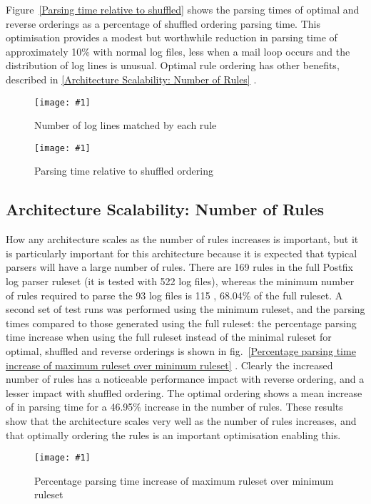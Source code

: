 \documentclass{svmult}
\newcommand{\showgraph}[3]{%
    \begin{figure}[btp]%
        \texttt{[image: \#1]}%
        \caption{#2}\label{#3}%
    \end{figure}%
}
\newcommand{\sectionref}[1]{%
    \textsection{}\vref*{#1}%
}
\newcommand{\refwithlabel}[2]{%
    #1~\vref{#2}%
}
\newcommand{\graphref}[1]{%
    \refwithlabel{fig.}{#1}%
}
\newcommand{\Graphref}[1]{%
    \refwithlabel{Figure}{#1}%
}
\newcommand{\numberOFlogFILES}[0]{%
    93%
}
\newcommand{\numberOFrules}[0]{%
    169%
}
\newcommand{\numberOFrulesMINIMUM}[0]{%
    115%
}
\newcommand{\numberOFlogFILESall}[0]{%
    522%
}
\newcommand{\numberOFrulesMINIMUMpercentage}[0]{%
    68.04\%%
}
\newcommand{\numberOFrulesMAXIMUMpercentage}[0]{%
    46.95\%%
}
\begin{document}
\Graphref{Parsing time relative to shuffled} shows the parsing times of
optimal and reverse orderings as a percentage of shuffled ordering parsing
time.  This optimisation provides a modest but worthwhile reduction in
parsing time of approximately 10\% with normal log files, less when a mail
loop occurs and the distribution of log lines is unusual.  Optimal rule
ordering has other benefits, described in \sectionref{Architecture
Scalability: Number of Rules}.  \showgraph{build/graph-hits}{Number of log
lines matched by each rule}{rule hits graph}
\showgraph{build/graph-optimal-and-reverse-vs-shuffle}{Parsing time
relative to shuffled ordering}{Parsing time relative to shuffled}

\subsection{Architecture Scalability: Number of Rules}

\label{Architecture Scalability: Number of Rules}

How any architecture scales as the number of rules increases is important,
but it is particularly important for this architecture because it is
expected that typical parsers will have a large number of rules.  There are
\numberOFrules{} rules in the full Postfix log parser ruleset (it is tested
with \numberOFlogFILESall{} log files), whereas the
minimum number of rules required to parse the \numberOFlogFILES{} log files
is \numberOFrulesMINIMUM{}, \numberOFrulesMINIMUMpercentage{} of the full
ruleset.  A second set of test runs was performed using the minimum
ruleset, and the parsing times compared to those generated using the full
ruleset: the percentage parsing time increase when using the full ruleset
instead of the minimal ruleset for optimal, shuffled and reverse orderings
is shown in \graphref{Percentage parsing time increase of maximum ruleset
over minimum ruleset}.  Clearly the increased number of rules has a
noticeable performance impact with reverse ordering, and a lesser impact
with shuffled ordering.  The optimal ordering shows a mean increase of
 in parsing time for a
\numberOFrulesMAXIMUMpercentage{} increase in the number of rules.  These
results show that the architecture scales very well as the number of rules
increases, and that optimally ordering the rules is an important
optimisation enabling this.
\showgraph{build/graph-full-ruleset-vs-minimum-ruleset}{Percentage parsing
time increase of maximum ruleset over minimum ruleset}{Percentage parsing
time increase of maximum ruleset over minimum ruleset}
\end{document}
